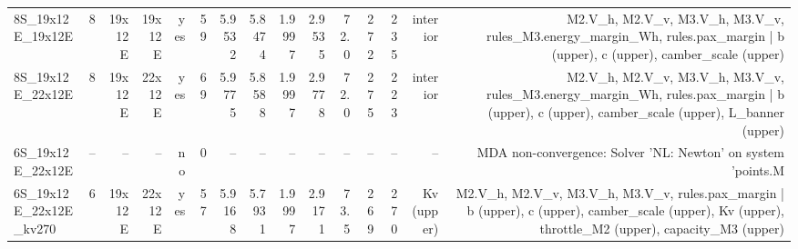 \begin{table}[htbp]
{\begin{tabular}{lrrrrrrrrrrrrrr}
8S\_19x12E\_19x12E & 8 & 19x12E & 19x12E & yes & 59 & 5.9532 & 5.8474 & 1.9997 & 2.9535 & 72.0 & 272 & 235 & interior & M2.V\_h, M2.V\_v, M3.V\_h, M3.V\_v, rules\_M3.energy\_margin\_Wh, rules.pax\_margin | b (upper), c (upper), camber\_scale (upper) \\
8S\_19x12E\_22x12E & 8 & 19x12E & 22x12E & yes & 69 & 5.9775 & 5.8588 & 1.9997 & 2.9778 & 72.0 & 275 & 223 & interior & M2.V\_h, M2.V\_v, M3.V\_h, M3.V\_v, rules\_M3.energy\_margin\_Wh, rules.pax\_margin | b (upper), c (upper), camber\_scale (upper), L\_banner (upper) \\
6S\_19x12E\_22x12E & -- & -- & -- & no & 0 & -- & -- & -- & -- & -- & -- & -- & -- & MDA non-convergence: Solver 'NL: Newton' on system 'points.M \\
6S\_19x12E\_22x12E\_kv270 & 6 & 19x12E & 22x12E & yes & 57 & 5.9168 & 5.7931 & 1.9997 & 2.9171 & 73.5 & 269 & 270 & Kv (upper) & M2.V\_h, M2.V\_v, M3.V\_h, M3.V\_v, rules.pax\_margin | b (upper), c (upper), camber\_scale (upper), Kv (upper), throttle\_M2 (upper), capacity\_M3 (upper) \\
\bottomrule
\end{tabular}}
\end{table}
